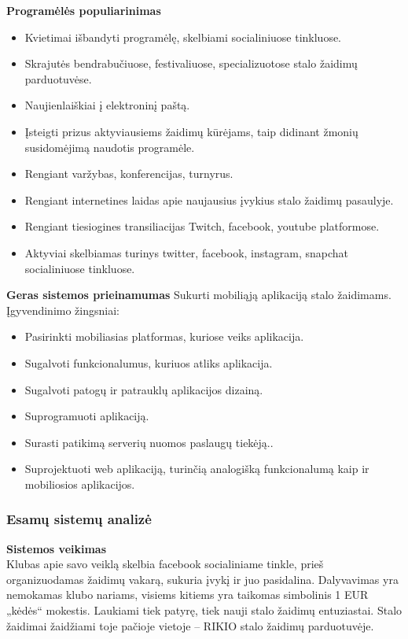 \documentclass{VUMIFPSkursinis}
\begin{document}
			\textbf{Programėlės populiarinimas}
			\renewcommand{\labelitemi}{$\bullet$}
				\begin{itemize}
					\item Kvietimai išbandyti programėlę, skelbiami socialiniuose tinkluose.
					\item Skrajutės bendrabučiuose, festivaliuose, specializuotose stalo žaidimų parduotuvėse.
					\item Naujienlaiškiai į elektroninį paštą.
					\item Įsteigti prizus aktyviausiems žaidimų kūrėjams, taip didinant žmonių susidomėjimą naudotis programėle.
					\item Rengiant varžybas, konferencijas, turnyrus.
					\item Rengiant internetines laidas apie naujausius įvykius stalo žaidimų pasaulyje.
					\item Rengiant tiesiogines transiliacijas Twitch, facebook, youtube platformose.
					\item Aktyviai skelbiamas turinys twitter, facebook, instagram, snapchat socialiniuose tinkluose.
				\end{itemize}
				
			\textbf{Geras sistemos prieinamumas}
			Sukurti mobiliąją aplikaciją stalo žaidimams. Įgyvendinimo žingsniai:
			\renewcommand{\labelitemi}{$\bullet$}
				\begin{itemize}
					\item Pasirinkti mobiliasias platformas, kuriose veiks aplikacija.
					\item Sugalvoti funkcionalumus, kuriuos atliks aplikacija.
					\item Sugalvoti patogų ir patrauklų aplikacijos dizainą.
					\item Suprogramuoti aplikaciją.
					\item Surasti patikimą serverių nuomos paslaugų tiekėją..
					\item Suprojektuoti web aplikaciją, turinčią analogišką funkcionalumą kaip ir mobiliosios aplikacijos.
				\end{itemize}
				
	\subsubsection{Esamų sistemų analizė}
			\textbf{Sistemos veikimas}\\
			Klubas apie savo veiklą skelbia facebook socialiniame tinkle, prieš 
			organizuodamas žaidimų vakarą, sukuria įvykį ir juo pasidalina. 
			Dalyvavimas yra nemokamas klubo nariams, visiems kitiems yra taikomas 
			simbolinis 1 EUR „kėdės“ mokestis. Laukiami tiek patyrę, tiek nauji 
			stalo žaidimų entuziastai. Stalo žaidimai žaidžiami toje pačioje vietoje 
			– RIKIO stalo žaidimų parduotuvėje.
\end{document}
